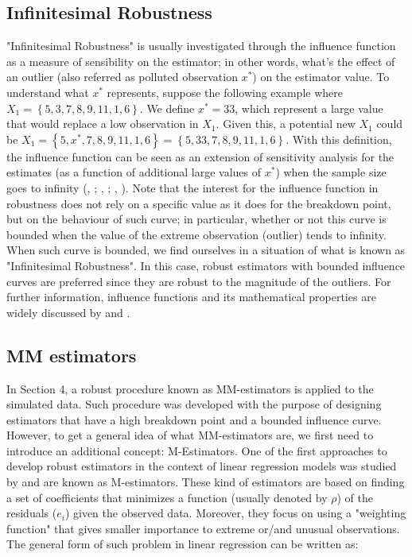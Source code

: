 \documentclass[a4paper]{article}
\begin{document}
\subsection{Infinitesimal Robustness}
"Infinitesimal Robustness" is usually investigated through the influence function as a measure of sensibility on the estimator; in other words, what's the effect of an outlier (also referred as polluted observation $x^*$) on the estimator value. To understand what $x^*$ represents, suppose the following example where $X_{1} = \left\{5,3,7,8,9,11,1,6\right\}$. We define $x^*=33$, which represent a large value that would replace a low observation in $X_1$. Given this, a potential new $X_1$ could be $X_{1} = \left\{5,x^*,7,8,9,11,1,6\right\}= \left\{5,33,7,8,9,11,1,6\right\}$. With this definition, the influence function can be seen as an extension of sensitivity analysis for the estimates (as a function of additional large values of $x^*$) when the sample size goes to infinity (\citeauthor{huber1981}, \citeyear{huber1981}; \citeauthor{ruckstuhl2016}, \citeyear{ruckstuhl2016}; \citeauthor{wilcox2016}, \citeyear{wilcox2016}). Note that the interest for the influence function in robustness does not rely on a specific value as it does for the breakdown point, but on the behaviour of such curve; in particular, whether or not this curve is bounded when the value of the extreme observation (outlier) tends to infinity. When such curve is bounded, we find ourselves in a situation of what is known as "Infinitesimal Robustness". In this case, robust estimators with bounded influence curves are preferred since they are robust to the magnitude of the outliers. For further information, influence functions and its mathematical properties are widely discussed by \citet{huber1981} and \citet{wilcox2016}.

\subsection{MM estimators}
In Section 4, a robust procedure known as MM-estimators is applied to the simulated data. Such procedure was developed with the purpose of designing estimators that have a high breakdown point and a bounded influence curve. However, to get a general idea of what MM-estimators are, we first need to introduce an additional concept: M-Estimators. One of the first approaches to develop robust estimators in the context of linear regression models was studied by \citet{huber1981} and are known as M-estimators. These kind of estimators are based on finding a set of coefficients that minimizes a function (usually denoted by $\rho$) of the residuals ($e_i$) given the observed data. Moreover, they focus on using a "weighting function" that gives smaller importance to extreme or/and unusual observations. The general form of such problem in linear regression can be written as:
\end{document}
